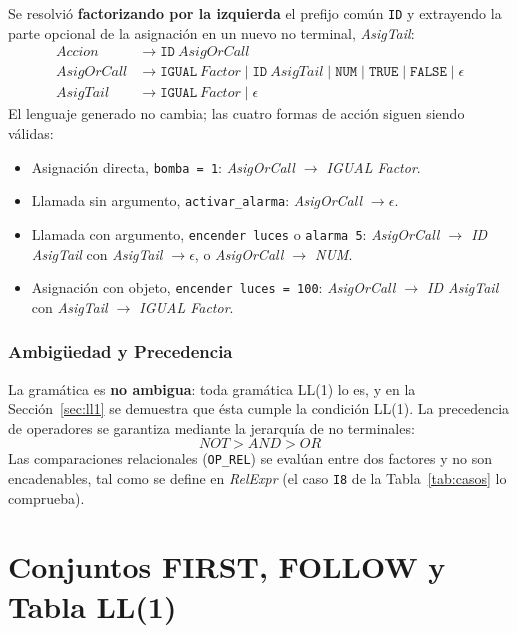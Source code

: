 \documentclass[12pt,a4paper]{article}
\begin{document}
Se resolvió \textbf{factorizando por la izquierda} el prefijo común \texttt{ID} y extrayendo la parte opcional de la asignación en un nuevo no terminal, \textit{AsigTail}:
\begin{align*}
\mathit{Accion} &\to \mathtt{ID}\ \mathit{AsigOrCall}\\
\mathit{AsigOrCall} &\to \mathtt{IGUAL}\ \mathit{Factor} \mid \mathtt{ID}\ \mathit{AsigTail} \mid \mathtt{NUM} \mid \mathtt{TRUE} \mid \mathtt{FALSE} \mid \epsilon\\
\mathit{AsigTail} &\to \mathtt{IGUAL}\ \mathit{Factor} \mid \epsilon
\end{align*}
El lenguaje generado no cambia; las cuatro formas de acción siguen siendo válidas:
\begin{itemize}[leftmargin=1cm]
    \item Asignación directa, \texttt{bomba = 1}: \textit{AsigOrCall $\to$ IGUAL Factor}.
    \item Llamada sin argumento, \texttt{activar\_alarma}: \textit{AsigOrCall $\to \epsilon$}.
    \item Llamada con argumento, \texttt{encender luces} o \texttt{alarma 5}: \textit{AsigOrCall $\to$ ID AsigTail} con \textit{AsigTail $\to \epsilon$}, o \textit{AsigOrCall $\to$ NUM}.
    \item Asignación con objeto, \texttt{encender luces = 100}: \textit{AsigOrCall $\to$ ID AsigTail} con \textit{AsigTail $\to$ IGUAL Factor}.
\end{itemize}

\subsubsection{Ambigüedad y Precedencia}
La gramática es \textbf{no ambigua}: toda gramática LL(1) lo es, y en la Sección~\ref{sec:ll1} se demuestra que ésta cumple la condición LL(1). La precedencia de operadores se garantiza mediante la jerarquía de no terminales:
\[
NOT > AND > OR
\]
Las comparaciones relacionales (\texttt{OP\_REL}) se evalúan entre dos factores y no son encadenables, tal como se define en \textit{RelExpr} (el caso \texttt{I8} de la Tabla~\ref{tab:casos} lo comprueba).

\newpage

\section{Conjuntos FIRST, FOLLOW y Tabla LL(1)}
\label{sec:first}
\end{document}
